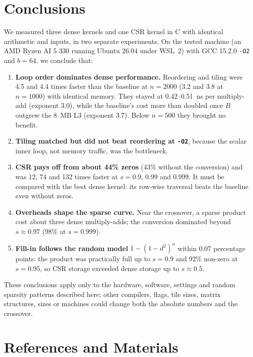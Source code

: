 \documentclass[conference,a4paper]{IEEEtran}
\newcommand{\code}[1]{\texttt{#1}}
\begin{document}
\section{Conclusions}
\label{sec:conclusions}
We measured three dense kernels and one CSR kernel in C with identical
arithmetic and inputs, in two separate experiments. On the tested machine (an
AMD Ryzen AI 5 330 running Ubuntu 26.04 under WSL~2) with GCC 15.2.0
\code{-O2} and $b = 64$, we conclude that:
\begin{enumerate}[itemsep=1pt]
  \item \textbf{Loop order dominates dense performance.} Reordering and tiling
        were 4.5 and 4.4 times faster than the baseline at $n = 2000$ (3.2 and
        3.8 at $n = 1000$) with identical memory. They stayed at 0.42--0.51~ns
        per multiply-add (exponent 3.0), while the baseline's cost more than
        doubled once $B$ outgrew the 8~MB L3 (exponent 3.7). Below $n = 500$
        they brought no benefit.
  \item \textbf{Tiling matched but did not beat reordering at \code{-O2}},
        because the scalar inner loop, not memory traffic, was the bottleneck.
  \item \textbf{CSR pays off from about 44\% zeros} (43\% without the
        conversion) and was 12, 74 and 132 times faster at $s = 0.9$, 0.99 and
        0.999. It must be compared with the best dense kernel: its row-wise
        traversal beats the baseline even without zeros.
  \item \textbf{Overheads shape the sparse curve.} Near the crossover, a sparse
        product cost about three dense multiply-adds; the conversion dominated
        beyond $s \approx 0.97$ (98\% at $s = 0.999$).
  \item \textbf{Fill-in follows the random model} $1 - (1 - d^2)^n$ within 0.07
        percentage points: the product was practically full up to $s = 0.9$ and
        92\% non-zero at $s = 0.95$, so CSR storage exceeded dense storage up to
        $s \approx 0.5$.
\end{enumerate}
These conclusions apply only to the hardware, software, settings and random
sparsity patterns described here; other compilers, flags, tile sizes, matrix
structures, sizes or machines could change both the absolute numbers and the
crossover.

\section*{References and Materials}
\end{document}
